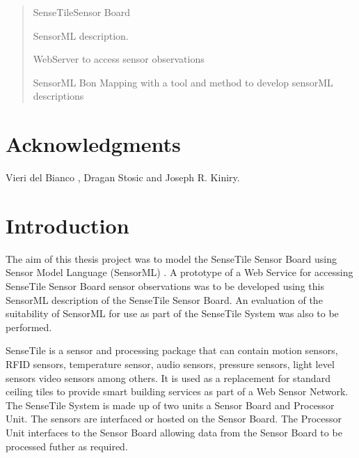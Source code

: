\documentclass[]{final_report}
\begin{document}
\maketitle
\tableofcontents{}\newpage


\begin{abstract}
SenseTileSensor Board

SensorML description.

WebServer to access sensor observations

SensorML Bon Mapping with a tool and method to develop sensorML descriptions

\end{abstract}




\newpage



\chapter*{Acknowledgments}

Vieri del Bianco , Dragan Stosic and Joseph R. Kiniry.


\chapter{Introduction}

The aim of this thesis project was to model the SenseTile Sensor Board using Sensor Model Language (SensorML)\cite{SMLref} . A prototype of a Web Service for accessing SenseTile Sensor Board sensor observations was to be developed using this SensorML description of the SenseTile Sensor Board. An evaluation of the suitability of SensorML for use as part of the SenseTile System was also to be performed.

SenseTile is a sensor and processing package that can contain motion sensors, RFID sensors, temperature sensor, audio sensors, pressure sensors, light level sensors video sensors among others. It is used as a replacement for standard ceiling tiles to provide smart building services as part of a Web Sensor Network. The SenseTile System is made up of two units a Sensor Board and Processor Unit. The sensors are interfaced or hosted on the Sensor Board. The Processor Unit interfaces to the Sensor Board allowing data from the Sensor Board to be processed futher as required.
\end{document}
